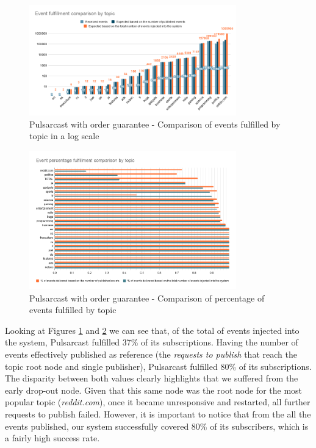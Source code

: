 \begin{figure}[!htb]
  \centering
  \includegraphics[width=0.8\textwidth]{../images/graph-pulsarcast-order-event-fulfillment-comparison.png}
  \caption{Pulsarcast with order guarantee - Comparison of events fulfilled by topic in a log scale}
  \label{fig:graph-pulsarcast-order-event-fulfillment-comparison}
\end{figure}

\begin{figure}[!htb]
  \centering
  \includegraphics[width=0.8\textwidth]{../images/graph-pulsarcast-order-event-percentage-fulfillment-comparison.png}
  \caption{Pulsarcast with order guarantee - Comparison of percentage of events fulfilled by topic}
  \label{fig:graph-pulsarcast-order-event-percentage-fulfillment-comparison}
\end{figure}

Looking at Figures
\ref{fig:graph-pulsarcast-order-event-fulfillment-comparison} and
\ref{fig:graph-pulsarcast-order-event-percentage-fulfillment-comparison} we can
see that, of the total of events injected into the system, Pulsarcast fulfilled
37\% of its subscriptions. Having the number of events effectively published as
reference (the \emph{requests to publish} that reach the topic root node and
single publisher), Pulsarcast fulfilled 80\% of its subscriptions. The
disparity between both values clearly highlights that we suffered from the
early drop-out node. Given that this same node was the root node for the most
popular topic (\emph{reddit.com}), once it became unresponsive and restarted,
all further requests to publish failed. However, it is important to notice
that from the all the events published, our system successfully covered 80\% of
its subscribers, which is a fairly high success rate.

